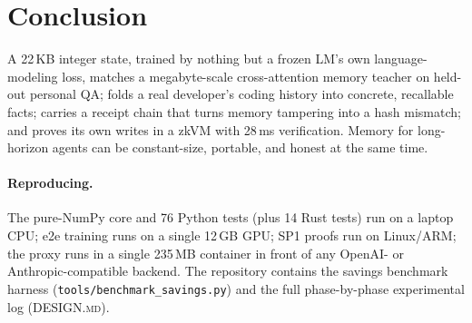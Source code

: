 \documentclass[11pt]{article}
\begin{document}
\section{Conclusion}
A 22\,KB integer state, trained by nothing but a frozen LM's own
language-modeling loss, matches a megabyte-scale cross-attention memory
teacher on held-out personal QA; folds a real developer's coding
history into concrete, recallable facts; carries a receipt chain that
turns memory tampering into a hash mismatch; and proves its own writes
in a zkVM with 28\,ms verification. Memory for long-horizon agents can
be constant-size, portable, and honest at the same time.

\paragraph{Reproducing.} The pure-NumPy core and 76 Python tests (plus
14 Rust tests) run on a laptop CPU; e2e training runs on a single 12\,GB
GPU; SP1 proofs run on Linux/ARM; the proxy runs in a single 235\,MB
container in front of any OpenAI- or Anthropic-compatible backend. The
repository contains the savings benchmark harness
(\texttt{tools/benchmark\_savings.py}) and the full phase-by-phase
experimental log (\textsc{DESIGN.md}).



\end{document}
